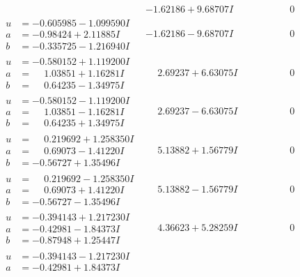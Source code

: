 \documentclass[1p]{elsarticle_modified}
\theoremstyle{definition}
\begin{document}
$$\begin{array}{c|c|c}
 & -1.62186 + 9.68707 I & \phantom{-0.000000 } 0 \\ \hline\begin{aligned}
u &= -0.605985 - 1.099590 I \\
a &= -0.98424 + 2.11885 I \\
b &= -0.335725 - 1.216940 I\end{aligned}
 & -1.62186 - 9.68707 I & \phantom{-0.000000 } 0 \\ \hline\begin{aligned}
u &= -0.580152 + 1.119200 I \\
a &= \phantom{-}1.03851 + 1.16281 I \\
b &= \phantom{-}0.64235 - 1.34975 I\end{aligned}
 & \phantom{-}2.69237 + 6.63075 I & \phantom{-0.000000 } 0 \\ \hline\begin{aligned}
u &= -0.580152 - 1.119200 I \\
a &= \phantom{-}1.03851 - 1.16281 I \\
b &= \phantom{-}0.64235 + 1.34975 I\end{aligned}
 & \phantom{-}2.69237 - 6.63075 I & \phantom{-0.000000 } 0 \\ \hline\begin{aligned}
u &= \phantom{-}0.219692 + 1.258350 I \\
a &= \phantom{-}0.69073 - 1.41220 I \\
b &= -0.56727 + 1.35496 I\end{aligned}
 & \phantom{-}5.13882 + 1.56779 I & \phantom{-0.000000 } 0 \\ \hline\begin{aligned}
u &= \phantom{-}0.219692 - 1.258350 I \\
a &= \phantom{-}0.69073 + 1.41220 I \\
b &= -0.56727 - 1.35496 I\end{aligned}
 & \phantom{-}5.13882 - 1.56779 I & \phantom{-0.000000 } 0 \\ \hline\begin{aligned}
u &= -0.394143 + 1.217230 I \\
a &= -0.42981 - 1.84373 I \\
b &= -0.87948 + 1.25447 I\end{aligned}
 & \phantom{-}4.36623 + 5.28259 I & \phantom{-0.000000 } 0 \\ \hline\begin{aligned}
u &= -0.394143 - 1.217230 I \\
a &= -0.42981 + 1.84373 I \\

\end{aligned}
\end{array}$$
\end{document}
